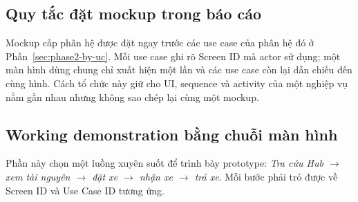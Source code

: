 \subsection{Quy tắc đặt mockup trong báo cáo}

Mockup cấp phân hệ được đặt ngay trước các use case của phân hệ đó ở Phần~\ref{sec:phase2-by-uc}. Mỗi use case ghi rõ Screen ID mà actor sử dụng; một màn hình dùng chung chỉ xuất hiện một lần và các use case còn lại dẫn chiếu đến cùng hình. Cách tổ chức này giữ cho UI, sequence và activity của một nghiệp vụ nằm gần nhau nhưng không sao chép lại cùng một mockup.

\subsection{Working demonstration bằng chuỗi màn hình}

Phần này chọn một luồng xuyên suốt để trình bày prototype: \textit{Tra cứu Hub $\rightarrow$ xem tài nguyên $\rightarrow$ đặt xe $\rightarrow$ nhận xe $\rightarrow$ trả xe}. Mỗi bước phải trỏ được về Screen ID và Use Case ID tương ứng.

